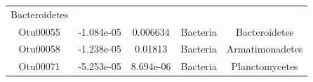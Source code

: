 \documentclass[]{article}
\begin{document}
\begin{longtable}[]{@{}ccccc@{}}
\begin{minipage}[t]{0.27\columnwidth}
Bacteroidetes\strut
\end{minipage}\tabularnewline
\begin{minipage}[t]{0.13\columnwidth}\centering\strut
Otu00055\strut
\end{minipage} & \begin{minipage}[t]{0.16\columnwidth}\centering\strut
-1.084e-05\strut
\end{minipage} & \begin{minipage}[t]{0.14\columnwidth}\centering\strut
0.006634\strut
\end{minipage} & \begin{minipage}[t]{0.13\columnwidth}\centering\strut
Bacteria\strut
\end{minipage} & \begin{minipage}[t]{0.27\columnwidth}\centering\strut
Bacteroidetes\strut
\end{minipage}\tabularnewline
\begin{minipage}[t]{0.13\columnwidth}\centering\strut
Otu00058\strut
\end{minipage} & \begin{minipage}[t]{0.16\columnwidth}\centering\strut
-1.238e-05\strut
\end{minipage} & \begin{minipage}[t]{0.14\columnwidth}\centering\strut
0.01813\strut
\end{minipage} & \begin{minipage}[t]{0.13\columnwidth}\centering\strut
Bacteria\strut
\end{minipage} & \begin{minipage}[t]{0.27\columnwidth}\centering\strut
Armatimonadetes\strut
\end{minipage}\tabularnewline
\begin{minipage}[t]{0.13\columnwidth}\centering\strut
Otu00071\strut
\end{minipage} & \begin{minipage}[t]{0.16\columnwidth}\centering\strut
-5.253e-05\strut
\end{minipage} & \begin{minipage}[t]{0.14\columnwidth}\centering\strut
8.694e-06\strut
\end{minipage} & \begin{minipage}[t]{0.13\columnwidth}\centering\strut
Bacteria\strut
\end{minipage} & \begin{minipage}[t]{0.27\columnwidth}\centering\strut
Planctomycetes\strut
\end{minipage}\tabularnewline

\end{longtable}
\end{document}
